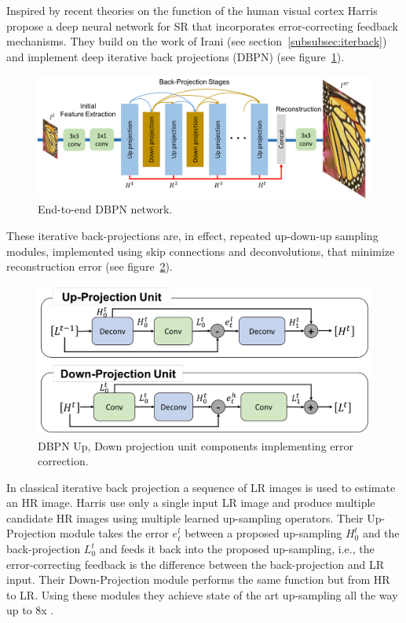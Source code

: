 Inspired by recent theories on the function of the human visual cortex \cite{kravitz2013ventral} Harris \etal \cite{haris2018deep} propose a deep neural network for SR that incorporates error-correcting feedback mechanisms.
%
They build on the work of Irani \etal (see section~\ref{subsubsec:iterback}) and implement deep iterative back projections (DBPN) (see figure~\ref{fig:dbpn}).
\begin{figure}[!htbp]
    \includegraphics[width=\textwidth,keepaspectratio]{figures/neural_networks/DBPN.png}
    \caption{End-to-end DBPN network.}\label{fig:dbpn}
\end{figure}
%
These iterative back-projections are, in effect, repeated up-down-up sampling modules, implemented using skip connections and deconvolutions, that minimize reconstruction error (see figure~\ref{fig:updowndbpn}).
\begin{figure}[!htbp]
    \includegraphics[width=.49\textwidth,keepaspectratio]{figures/neural_networks/up_down_up.png}
    \caption{DBPN Up, Down projection unit components implementing error correction.}\label{fig:updowndbpn}
\end{figure}
%
In classical iterative back projection a sequence of LR images is used to estimate an HR image.
%
Harris \etal use only a single input LR image and produce multiple candidate HR images using multiple learned up-sampling operators.
%
Their Up-Projection module takes the error \(e_t^l\) between a proposed up-sampling \(H_0^t\) and the back-projection \(L_0^t\) and feeds it back into the proposed up-sampling, i.e., the error-correcting feedback is the difference between the back-projection and LR input.
%
Their Down-Projection module performs the same function but from HR to LR.
%
Using these modules they achieve state of the art up-sampling all the way up to 8x \cite{timofte2018ntire}.

